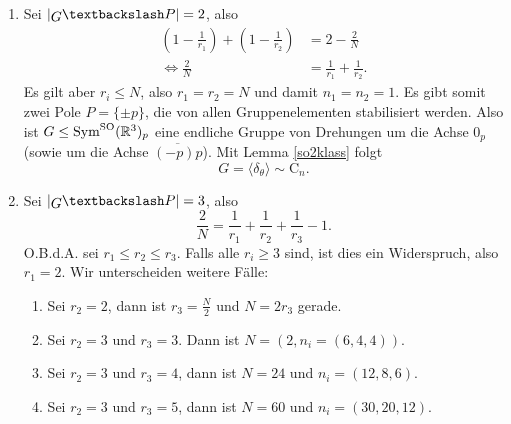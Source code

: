 \begin{beweis}
\begin{enumerate}[2.]
\begin{enumerate}[1. {Fall}:]
\item Sei $\left|\invquotient{G}{P}\right| =2$, also 
\begin{align}
\left( 1 - \frac{1}{r_1}\right) + \left(1 - \frac{1}{r_2} \right) &= 2 - \frac{2}{N}\\
\iff \frac{2}{N} &= \frac{1}{r_1}+ \frac{1}{r_2}.
\end{align}
Es gilt aber $r_i \leq N$, also $r_1=r_2=N$ und damit $n_1=n_2=1$. Es gibt somit zwei Pole $P=\{\pm p\}$, die von allen Gruppenelementen stabilisiert werden. Also ist $G \leq \text{Sym}^\text{SO} (\mathbb{R}^3)_p$ eine endliche Gruppe von Drehungen um die Achse $0_p$ (sowie um die Achse $\overline{(-p)p}$). Mit Lemma \ref{so2klass} folgt
\begin{equation}
G = \langle \delta_\theta \rangle \sim \text{C}_n.
\end{equation}
\item Sei $\left|\invquotient{G}{P}\right| =3$, also 
\begin{equation}
\frac{2}{N} = \frac{1}{r_1} + \frac{1}{r_2} + \frac{1}{r_3} - 1.
\end{equation}
O.B.d.A. sei $r_1 \leq r_2 \leq r_3$. Falls alle $r_i \geq 3$ sind, ist dies ein Widerspruch, also $r_1 = 2$. Wir unterscheiden weitere Fälle:
\begin{enumerate}[{3.}1. {Fall:}]
\item Sei $r_2=2$, dann ist $r_3 = \frac{N}{2}$ und $N=2r_3$ gerade.
\item Sei $r_2=3$ und $r_3 = 3$. Dann ist $N = (2, n_i = (6,4,4))$.
\item Sei $r_2 = 3$ und $r_3 = 4$, dann ist $N=24$ und $n_i = (12,8,6)$.
\item Sei $r_2=3$ und $r_3 =5$, dann ist $N=60$ und $n_i=(30,20,12)$.
\end{enumerate}
\end{enumerate}
\end{enumerate}
\end{beweis}